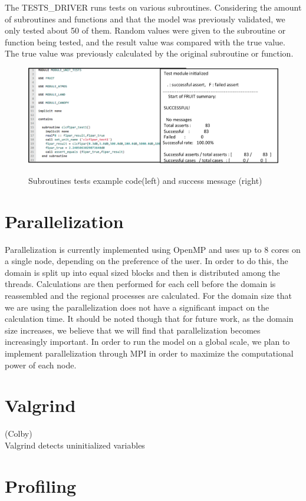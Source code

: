 \documentclass[pdftex,12pt,a4paper]{article}
\begin{document}
The TESTS\_DRIVER runs tests on various subroutines. Considering the amount of subroutines and functions and that the model was previously validated, we only tested about 50 of them. Random values were given to the subroutine or function being tested, and the result value was compared with the true value. The true value was previously calculated by the original subroutine or function. 

\begin{figure}[h]
	\centering
	\includegraphics[width=5.5in]{Figures/Tests2.png}
	\label{Tests1}
	\caption{Subroutines tests example code(left) and success message (right)}
\end{figure}

\section{Parallelization}
Parallelization is currently implemented using OpenMP and uses up to 8 cores on a single node, depending on the preference of the user.  In order to do this, the domain is split up into equal sized blocks and then is distributed among the threads. Calculations are then performed for each cell before the domain is reassembled and the regional processes are calculated. For the domain size that we are using the parallelization does not have a significant impact on the calculation time. It should be noted though that for future work, as the domain size increases, we believe that we will find that parallelization becomes increasingly important. In order to run the model on a global scale, we plan to implement parallelization through MPI in order to maximize the computational power of each node.

\section{Valgrind}
{(Colby)}
{\\ Valgrind detects uninitialized variables}

\section{Profiling}
\end{document}
